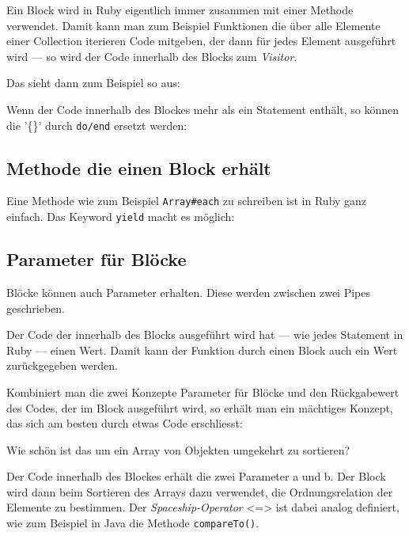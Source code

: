 \documentclass[a4book,11pt,twoside]{scrbook}
\begin{document}
Ein Block wird in Ruby eigentlich immer zusammen mit einer Methode verwendet. Damit kann man zum Beispiel Funktionen die über alle Elemente einer Collection iterieren Code mitgeben, der dann für jedes Element ausgeführt wird — so wird der Code innerhalb des Blocks zum \emph{Visitor}.

Das sieht dann zum Beispiel so aus:



Wenn der Code innerhalb des Blockes mehr als ein Statement enthält, so können die '\{\}' durch \texttt{do/end} ersetzt werden:



\subsection*{Methode die einen Block erhält} %
\label{sub:methode_die_einen_block_erhält}
Eine Methode wie zum Beispiel \texttt{Array\#each} zu schreiben ist in Ruby ganz einfach. Das Keyword \texttt{yield} macht es möglich:



\subsection*{Parameter für Blöcke} %
\label{sub:parameter_für_blöcke}
Blöcke können auch Parameter erhalten. Diese werden zwischen zwei Pipes geschrieben.


Der Code der innerhalb des Blocks ausgeführt wird hat — wie jedes Statement in Ruby — einen Wert. Damit kann der Funktion durch einen Block auch ein Wert zurückgegeben werden.

Kombiniert man die zwei Konzepte Parameter für Blöcke und den Rückgabewert des Codes, der im Block ausgeführt wird, so erhält man ein mächtiges Konzept, das sich am besten durch etwas Code erschliesst:



Wie schön ist das um ein Array von Objekten umgekehrt zu sortieren?

Der Code innerhalb des Blockes erhält die zwei Parameter a und b. Der Block wird dann beim Sortieren des Arrays dazu verwendet, die Ordnungsrelation der Elemente zu bestimmen. Der \emph{Spaceship-Operator} <=> ist dabei analog definiert, wie zum Beispiel in Java die Methode \texttt{compareTo()}.
\end{document}
